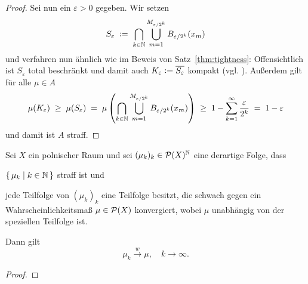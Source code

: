 \documentclass[../main/main.tex]{subfiles}
\begin{document}
\begin{proof}
		Sei nun ein $\varepsilon > 0$ gegeben. Wir setzen 
		\[ S_\varepsilon 
		\; \vcentcolon = \; \bigcap_{k \in \mathbb{N}} \bigcup_{m=1}^{M_{\varepsilon / 2^k}} 
		B_{\varepsilon / 2^k}(x_m) \]
		und verfahren nun ähnlich wie im Beweis von Satz~\ref{thm:tightness}: Offensichtlich ist $S_\varepsilon$ total beschränkt und damit auch 
		$ K_\varepsilon \vcentcolon = \overline{S_\varepsilon}$ kompakt (vgl. \cite[Satz 2.3.8]{Simon.2015}). 
		Außerdem gilt für alle $\mu \in A$
		\[
		\mu(K_\varepsilon) \; \geq \; \mu(S_\varepsilon) \; = \; \mu\left(\bigcap_{k \in \mathbb{N}} \bigcup_{m=1}^{M_{\varepsilon / 2^k}} 
		B_{\varepsilon / 2^k}(x_m)\right)
		\; \geq \; 1 - \sum_{k=1}^{\infty} \frac{\varepsilon}{2^k} \; = \; 1 - \varepsilon
		\]
		und damit ist $A$ straff.
	\end{proof}

	\begin{Folgerung}
		\label{cor:subsequenceofsubsequence}
		Sei $X$ ein polnischer Raum und sei $(\mu_k)_k \in \mathcal{P}(X)^{\mathbb{N}}$ eine derartige Folge, dass 
		\begin{itemizethm}
			\item $\left\{\, \mu_k \; \middle| \; k \in \mathbb{N} \,\right\}$ straff ist und
			\item jede Teilfolge von $(\mu_k)_k$ eine Teilfolge besitzt, die schwach gegen ein Wahrscheinlichkeitsmaß $\mu \in \mathcal{P}(X)$ konvergiert, wobei $\mu$ unabhängig von der speziellen Teilfolge ist.
		\end{itemizethm}
		Dann gilt \[\mu_k \xrightarrow{w} \mu, \quad k \to \infty \text{.} \]
	\end{Folgerung}
	
	\begin{proof}
	\end{proof}
	
\end{document}
